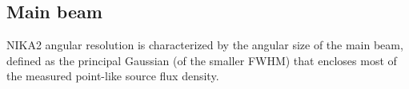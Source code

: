 %



\subsection{Main beam}
\label{se:mainbeam}

NIKA2 angular resolution {\lp is characterized by} the angular size of the main beam,
defined as the principal Gaussian (of the smaller FWHM) that encloses
most of the measured point-like source flux density.

